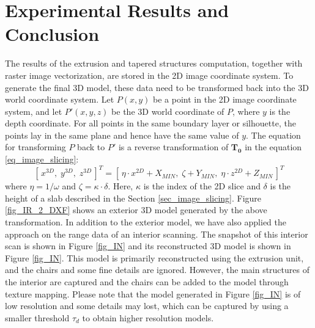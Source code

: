 \documentclass{llncs}
\begin{document}
\section{Experimental Results and Conclusion}
\label{sec_IR_OUT}
The results of the extrusion and tapered structures computation,
together with raster image vectorization, are stored in the 2D
image coordinate system. To generate the final 3D model, these
data need to be transformed
back into the 3D world coordinate system.
Let $P(x,y)$ be a point in the 2D image coordinate system, and let
$P'(x,y,z)$ be the 3D world coordinate of $P$, where $y$ is the depth coordinate.
For all points in the same boundary layer or silhouette,
the points lay in the same plane and hence have the same value of $y$.
The equation for transforming $P$ back to $P'$ is a reverse transformation of $\boldsymbol{T_0}$
in the equation \ref{eq_image_slicing}:
\begin{equation}\label{eq_ir2dxf}
[\,x^{3D},\; y^{3D},\; z^{3D}\,]^T = [\,\eta\cdot x^{2D} + X_{MIN},\; \zeta + Y_{MIN},\; \eta\cdot z^{2D} + Z_{MIN}\,]^T
\end{equation}
where $\eta=1/\omega$ and $\zeta=\kappa\cdot\delta$. Here, $\kappa$ is the index of the 2D slice and $\delta$
is the height of a slab described in the Section \ref{sec_image_slicing}.
Figure \ref{fig_IR_2_DXF} shows an exterior 3D model
generated by the above transformation.
In addition to the exterior model, we have also applied the approach on
the range data of an interior scanning.
The snapshot of this interior scan is shown in Figure \ref{fig_IN}
and its reconstructed 3D model is shown in Figure \ref{fig_IN}.
This model is primarily reconstructed using the extrusion unit, and the
chairs and some fine details are ignored. However, the
main structures of the interior are captured and the chairs can be added to
the model through texture mapping.
Please note that the model generated in  Figure \ref{fig_IN}
is of low resolution and some details may lost, which can be captured by using
a smaller threshold $\tau_d$ to obtain higher resolution models.
\end{document}
